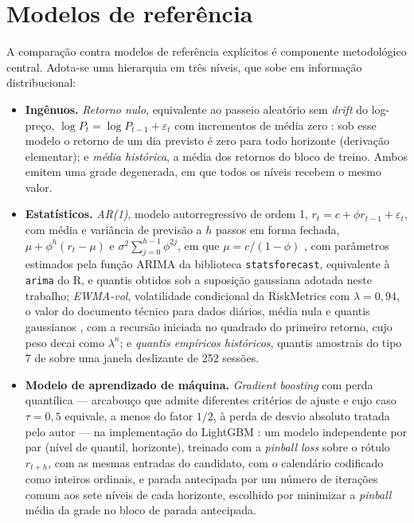 \section{Modelos de referência}
A comparação contra modelos de referência explícitos é componente metodológico central. Adota-se uma hierarquia em três níveis, que sobe em informação distribucional:
\begin{itemize}
    \item \textbf{Ingênuos.} \textit{Retorno nulo}, equivalente ao passeio aleatório sem \textit{drift} do log-preço, \(\log P_t = \log P_{t-1} + \varepsilon_t\) com incrementos de média zero \cite{CAMPBELL1997}: sob esse modelo o retorno de um dia previsto é zero para todo horizonte (derivação elementar); e \textit{média histórica}, a média dos retornos do bloco de treino. Ambos emitem uma grade degenerada, em que todos os níveis recebem o mesmo valor.
    \item \textbf{Estatísticos.} \textit{AR(1)}, modelo autorregressivo de ordem 1, \(r_t = c + \phi r_{t-1} + \varepsilon_t\), com média e variância de previsão a \(h\) passos em forma fechada, \(\mu + \phi^h(r_t - \mu)\) e \(\sigma^2 \sum_{j=0}^{h-1}\phi^{2j}\), em que \(\mu = c/(1-\phi)\) \cite{HAMILTON1994}, com parâmetros estimados pela função ARIMA da biblioteca \texttt{statsforecast}, equivalente à \texttt{arima} do R, e quantis obtidos sob a suposição gaussiana adotada neste trabalho; \textit{EWMA-vol}, volatilidade condicional da RiskMetrics com \(\lambda = 0{,}94\), o valor do documento técnico para dados diários, média nula e quantis gaussianos \cite{RISKMETRICS1996}, com a recursão iniciada no quadrado do primeiro retorno, cujo peso decai como \(\lambda^n\); e \textit{quantis empíricos históricos}, quantis amostrais do tipo 7 de  sobre uma janela deslizante de 252 sessões.
    \item \textbf{Modelo de aprendizado de máquina.} \textit{Gradient boosting} \cite{FRIEDMAN2001} com perda quantílica --- arcabouço que admite diferentes critérios de ajuste e cujo caso \(\tau = 0{,}5\) equivale, a menos do fator \(1/2\), à perda de desvio absoluto tratada pelo autor --- na implementação do LightGBM \cite{KE2017LIGHTGBM}: um modelo independente por par (nível de quantil, horizonte), treinado com a \textit{pinball loss} sobre o rótulo \(r_{t+h}\), com as mesmas entradas do candidato, com o calendário codificado como inteiros ordinais, e parada antecipada por um número de iterações comum aos sete níveis de cada horizonte, escolhido por minimizar a \textit{pinball} média da grade no bloco de parada antecipada.
\end{itemize}

